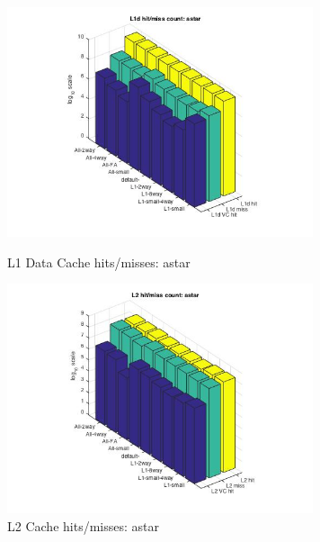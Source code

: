 \documentclass[11pt,titlepage]{article}
\begin{document}
        \begin{figure}[H]
          \centering
          \begin{minipage}{.45\textwidth}
            \includegraphics[width=9cm]{L1DHM_astar}
            \caption{L1 Data Cache hits/misses: astar}
            \label{fig:L1DHM_astar}
          \end{minipage}
          \begin{minipage}{.45\textwidth}
            \includegraphics[width=9cm]{L2HM_astar}
            \caption{L2 Cache hits/misses: astar}
            \label{fig:L2HM_astar}
          \end{minipage}
	\end{figure}
\end{document}
